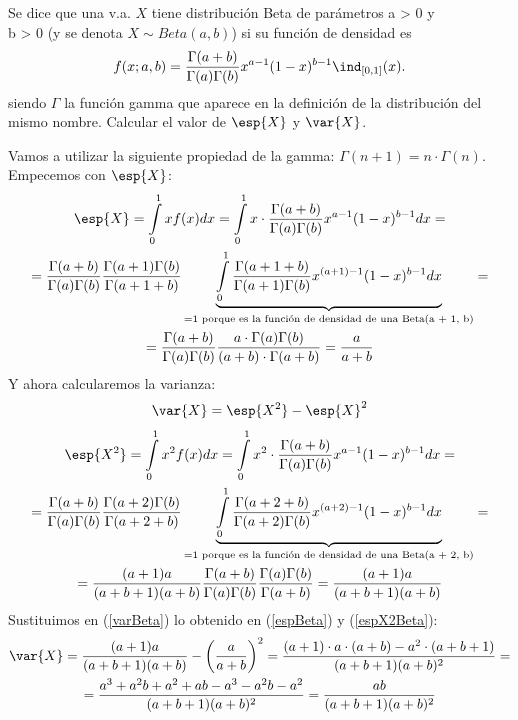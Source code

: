 \begin{problem}[6]
Se dice que una v.a. $X$ tiene distribución Beta de parámetros a > 0 y\\
b > 0 (y se denota $X \sim Beta(a, b)$) si su función de densidad es
\[ f(x; a, b) = \frac{\Gamma(a + b)}{\Gamma(a) \Gamma(b)} x^{a-1} (1-x)^{b-1} \ind_{\left[ 0, 1 \right]}(x). \]
siendo $\Gamma$ la función gamma que aparece en la definición de la distribución del mismo nombre.
Calcular el valor de $\esp{X}$ y $\var{X}$.
\solution

Vamos a utilizar la siguiente propiedad de la gamma: $\Gamma(n + 1) = n \cdot \Gamma(n)$.\\
Empecemos con $\esp{X}$:
\begin{gather}\label{espBeta}
\esp{X} =
\int\limits_{0}^{1} x f(x) dx =
\int\limits_{0}^{1} x \cdot \frac{\Gamma(a + b)}{\Gamma(a) \Gamma(b)} x^{a-1} (1-x)^{b-1} dx = \\
= \frac{\Gamma(a + b)}{\Gamma(a) \Gamma(b)} \frac{\Gamma(a + 1) \Gamma(b)}{\Gamma(a + 1 + b)} \underbrace{\int\limits_{0}^{1} \frac{\Gamma(a + 1 + b)}{\Gamma(a + 1) \Gamma(b)} x^{(a + 1) - 1} (1 - x)^{b - 1} dx}_{= 1 \text{ porque es la función de densidad de una Beta(a + 1, b)}} = \nonumber\\
= \frac{\Gamma(a + b)}{\Gamma(a) \Gamma(b)} \frac{a \cdot \Gamma(a) \Gamma(b)}{(a + b)\cdot\Gamma(a + b)} =
\frac{a}{a + b}\nonumber
\end{gather}
Y ahora calcularemos la varianza:
\begin{gather}\label{varBeta}
\var{X} = \esp{X^2} - \esp{X}^2
\end{gather}
\begin{gather}\label{espX2Beta}
\esp{X^2} =
\int\limits_{0}^{1} x^2 f(x) dx =
\int\limits_{0}^{1} x^2 \cdot \frac{\Gamma(a + b)}{\Gamma(a) \Gamma(b)} x^{a-1} (1-x)^{b-1} dx = \\
= \frac{\Gamma(a + b)}{\Gamma(a) \Gamma(b)} \frac{\Gamma(a + 2) \Gamma(b)}{\Gamma(a + 2 + b)} \underbrace{\int\limits_{0}^{1} \frac{\Gamma(a + 2 + b)}{\Gamma(a + 2) \Gamma(b)} x^{(a + 2) - 1} (1 - x)^{b - 1} dx}_{= 1 \text{ porque es la función de densidad de una Beta(a + 2, b)}} =\nonumber\\
= \frac{(a + 1) a}{(a + b + 1) (a + b)} \frac{\Gamma(a + b)}{\Gamma(a) \Gamma(b)} \frac{\Gamma(a) \Gamma(b)}{\Gamma(a + b)} =
\frac{(a + 1) a}{(a + b + 1) (a + b)} \nonumber
\end{gather}
Sustituimos en (\ref{varBeta}) lo obtenido en (\ref{espBeta}) y (\ref{espX2Beta}):
\begin{gather*}
\var{X} =
\frac{(a + 1) a}{(a + b + 1) (a + b)} - \left( \frac{a}{a + b} \right)^2 =
\frac{(a + 1) \cdot a \cdot (a + b) - a^2 \cdot (a + b + 1)}{(a + b + 1) (a + b)^2} =\\
= \frac{a^3 + a^2 b + a^2 + ab - a^3 -a^2 b - a^2}{(a + b + 1) (a + b)^2} =
\frac{ab}{(a + b + 1) (a + b)^2}
\end{gather*}
\end{problem}



